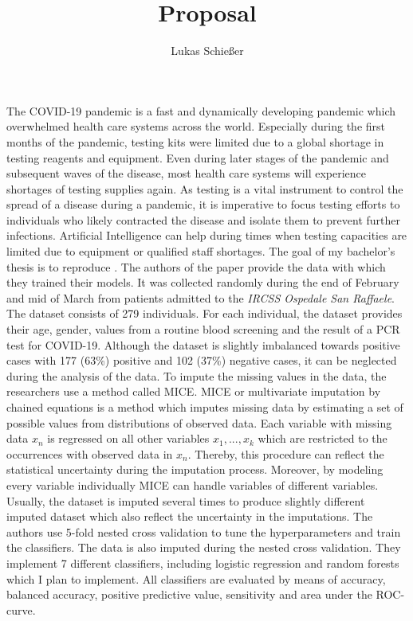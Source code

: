 \documentclass[12pt,a4paper,oneside]{article}
\title{Proposal}
\author{Lukas Schießer}
\date{}
\begin{document}
\maketitle
The COVID-19 pandemic is a fast and dynamically developing pandemic which overwhelmed health care systems across the world. Especially during the first months of the pandemic, testing kits were limited due to a global shortage in testing reagents and equipment. Even during later stages of the pandemic and subsequent waves of the disease, most health care systems will experience shortages of testing supplies again.\cite{jaecklin_2020,asm.org_2020}
As testing is a vital instrument to control the spread of a disease during a pandemic, it is imperative to focus testing efforts to individuals who likely contracted the disease and isolate them to prevent further infections.
Artificial Intelligence can help during times when testing capacities are limited due to equipment or qualified staff shortages.
The goal of my bachelor's thesis is to reproduce \cite{RN127}. The authors of the paper provide the data with which they trained their models. It was collected randomly during the end of February and mid of March from patients admitted to the \textit{IRCSS Ospedale San Raffaele}. The dataset consists of 279 individuals. For each individual, the dataset provides their age, gender, values from a routine blood screening and the result of a PCR test for COVID-19. Although the dataset is slightly imbalanced towards positive cases with 177 (63\%) positive and 102 (37\%) negative cases, it can be neglected during the analysis of the data. To impute the missing values in the data, the researchers use a method called MICE. MICE or multivariate imputation by chained equations is a method which imputes missing data by estimating a set of possible values from distributions of observed data. Each variable with missing data $x_n$ is regressed on all other variables $x_1, ..., x_k$ which are restricted to the occurrences with observed data in $x_n$. \cite{RN141,RN142} Thereby, this procedure can reflect the statistical uncertainty during the imputation process. Moreover, by modeling every variable individually MICE can handle variables of different variables. Usually, the dataset is imputed several times to produce slightly different imputed dataset which also reflect the uncertainty in the imputations. The authors use 5-fold nested cross validation to tune the hyperparameters and train the classifiers. The data is also imputed during the nested cross validation. They implement 7 different classifiers, including logistic regression and random forests which I plan to implement. All classifiers are evaluated by means of accuracy, balanced accuracy, positive predictive value, sensitivity and area under the ROC-curve.
\end{document}
